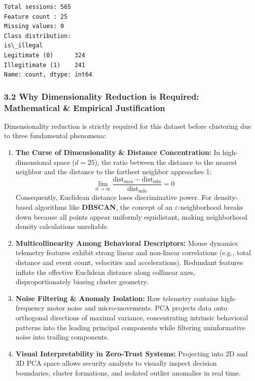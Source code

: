 \documentclass[11pt]{article}
\begin{document}
    \begin{Verbatim}[commandchars=\\\{\}]
Total sessions: 565
Feature count : 25
Missing values: 0
Class distribution:
is\_illegal
Legitimate (0)      324
Illegitimate (1)    241
Name: count, dtype: int64
    \end{Verbatim}

    \subsubsection{3.2 Why Dimensionality Reduction is Required:
Mathematical \& Empirical
Justification}\label{why-dimensionality-reduction-is-required-mathematical-empirical-justification}

Dimensionality reduction is strictly required for this dataset before
clustering due to three fundamental phenomena:

\begin{enumerate}
\def\labelenumi{\arabic{enumi}.}
\item
  \textbf{The Curse of Dimensionality \& Distance Concentration:} In
  high-dimensional space (\(d = 25\)), the ratio between the distance to
  the nearest neighbor and the distance to the farthest neighbor
  approaches 1:
  \[\lim_{d \to \infty} \frac{\text{dist}_{\max} - \text{dist}_{\min}}{\text{dist}_{\min}} = 0\]
  Consequently, Euclidean distance loses discriminative power. For
  density-based algorithms like \textbf{DBSCAN}, the concept of an
  \(\varepsilon\)-neighborhood breaks down because all points appear
  uniformly equidistant, making neighborhood density calculations
  unreliable.
\item
  \textbf{Multicollinearity Among Behavioral Descriptors:} Mouse
  dynamics telemetry features exhibit strong linear and non-linear
  correlations (e.g., total distance and event count, velocities and
  accelerations). Redundant features inflate the effective Euclidean
  distance along collinear axes, disproportionately biasing cluster
  geometry.
\item
  \textbf{Noise Filtering \& Anomaly Isolation:} Raw telemetry contains
  high-frequency motor noise and micro-movements. PCA projects data onto
  orthogonal directions of maximal variance, concentrating intrinsic
  behavioral patterns into the leading principal components while
  filtering uninformative noise into trailing components.
\item
  \textbf{Visual Interpretability in Zero-Trust Systems:} Projecting
  into 2D and 3D PCA space allows security analysts to visually inspect
  decision boundaries, cluster formations, and isolated outlier
  anomalies in real time.
\end{enumerate}
\end{document}
